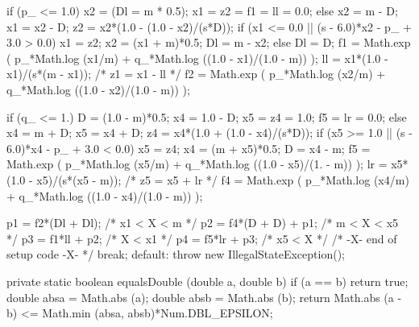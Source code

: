 \begin{code}
\begin{hide}
{{         if (p_ <= 1.0) {
            x2 = (Dl = m * 0.5);
            x1 = z2 = f1 = ll = 0.0;
         }
         else {
            x2 = m - D;
            x1 = x2 - D;
            z2 = x2*(1.0 - (1.0 - x2)/(s*D));
            if (x1 <= 0.0 || (s - 6.0)*x2 - p_ + 3.0 > 0.0) {
               x1 = z2;  x2 = (x1 + m)*0.5;
               Dl = m - x2;
            }
            else {
               Dl = D;
            }
            f1 = Math.exp ( p_*Math.log (x1/m) 
                          + q_*Math.log ((1.0 - x1)/(1.0 - m)) );
            ll = x1*(1.0 - x1)/(s*(m - x1));            /* z1 = x1 - ll   */
         }
         f2 = Math.exp ( p_*Math.log (x2/m) 
                       + q_*Math.log ((1.0 - x2)/(1.0 - m)) );

         if (q_ <= 1.) {
            D = (1.0 - m)*0.5;
            x4 = 1.0 - D;
            x5 = z4 = 1.0;
            f5 = lr = 0.0;
         }
         else {
            x4 = m + D;
            x5 = x4 + D;
            z4 = x4*(1.0 + (1.0 - x4)/(s*D));
            if (x5 >= 1.0 || (s - 6.0)*x4 - p_ + 3.0 < 0.0) {
               x5 = z4;
               x4 = (m + x5)*0.5;
               D = x4 - m;
            }
            f5 = Math.exp ( p_*Math.log (x5/m) 
                          + q_*Math.log ((1.0 - x5)/(1. - m)) );
            lr = x5*(1.0 - x5)/(s*(x5 - m));            /* z5 = x5 + lr   */
         }
         f4 = Math.exp ( p_*Math.log (x4/m) 
                       + q_*Math.log ((1.0 - x4)/(1.0 - m)) );

         p1 = f2*(Dl + Dl);                                /*  x1 < X < m    */
         p2 = f4*(D  + D) + p1;                            /*  m  < X < x5   */
         p3 = f1*ll       + p2;                            /*       X < x1   */
         p4 = f5*lr       + p3;                            /*  x5 < X        */
         /* -X- end of setup code -X- */
         break;
      default: throw new IllegalStateException();
      }
   }

   private static boolean equalsDouble (double a, double b) {
      if (a == b)
         return true;
      double absa = Math.abs (a);
      double absb = Math.abs (b);
      return Math.abs (a - b) <= Math.min (absa, absb)*Num.DBL_EPSILON;
   }

\end{hide}\end{code}
